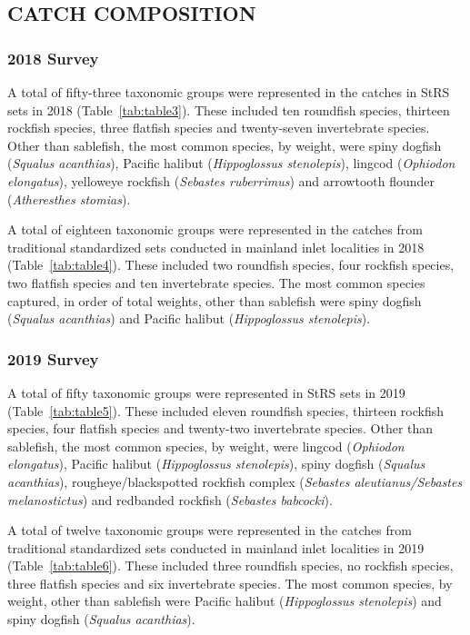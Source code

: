 \documentclass[12pt]{article}\usepackage[]{graphicx}\usepackage[]{color}
\begin{document}
\hypertarget{catch-composition}{%
\subsection{CATCH COMPOSITION}\label{catch-composition}}

\hypertarget{survey-2}{%
\subsubsection{2018 Survey}\label{survey-2}}

A total of fifty-three taxonomic groups were represented in the catches in StRS sets in 2018 (Table~\ref{tab:table3}). These included ten roundfish species, thirteen rockfish species, three flatfish species and twenty-seven invertebrate species. Other than sablefish, the most common species, by weight, were spiny dogfish (\emph{Squalus acanthias}), Pacific halibut (\emph{Hippoglossus stenolepis}), lingcod (\emph{Ophiodon elongatus}), yelloweye rockfish (\emph{Sebastes ruberrimus}) and arrowtooth flounder (\emph{Atheresthes stomias}).

A total of eighteen taxonomic groups were represented in the catches from traditional standardized sets conducted in mainland inlet localities in 2018 (Table~\ref{tab:table4}). These included two roundfish species, four rockfish species, two flatfish species and ten invertebrate species. The most common species captured, in order of total weights, other than sablefish were spiny dogfish (\emph{Squalus acanthias}) and Pacific halibut (\emph{Hippoglossus stenolepis}).

\hypertarget{survey-3}{%
\subsubsection{2019 Survey}\label{survey-3}}

A total of fifty taxonomic groups were represented in StRS sets in 2019 (Table~\ref{tab:table5}). These included eleven roundfish species, thirteen rockfish species, four flatfish species and twenty-two invertebrate species. Other than sablefish, the most common species, by weight, were lingcod (\emph{Ophiodon elongatus}), Pacific halibut (\emph{Hippoglossus stenolepis}), spiny dogfish (\emph{Squalus acanthias}), rougheye/blackspotted rockfish complex (\emph{Sebastes aleutianus/Sebastes melanostictus}) and redbanded rockfish (\emph{Sebastes babcocki}).

A total of twelve taxonomic groups were represented in the catches from traditional standardized sets conducted in mainland inlet localities in 2019 (Table~\ref{tab:table6}). These included three roundfish species, no rockfish species, three flatfish species and six invertebrate species. The most common species, by weight, other than sablefish were Pacific halibut (\emph{Hippoglossus stenolepis}) and spiny dogfish (\emph{Squalus acanthias}).
\end{document}
